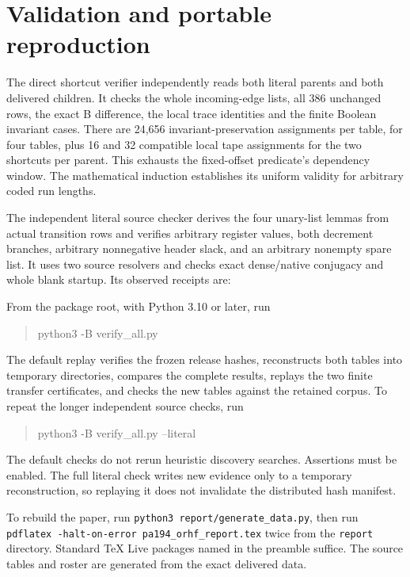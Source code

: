 \documentclass[11pt]{article}
\begin{document}
\section{Validation and portable reproduction}
The direct shortcut verifier independently reads both literal parents and both delivered children. It checks the whole incoming-edge lists, all 386 unchanged rows, the exact B difference, the local trace identities and the finite Boolean invariant cases. There are 24,656 invariant-preservation assignments per table, for four tables, plus 16 and 32 compatible local tape assignments for the two shortcuts per parent. This exhausts the fixed-offset predicate's dependency window. The mathematical induction establishes its uniform validity for arbitrary coded run lengths.

The independent literal source checker derives the four unary-list lemmas from actual transition rows and verifies arbitrary register values, both decrement branches, arbitrary nonnegative header slack, and an arbitrary nonempty spare list. It uses two source resolvers and checks exact dense/native conjugacy and whole blank startup. Its observed receipts are:
\begin{center}\end{center}

From the package root, with Python 3.10 or later, run
\begin{quote}\ttfamily
python3 -B verify\_all.py
\end{quote}
The default replay verifies the frozen release hashes, reconstructs both tables into temporary directories, compares the complete results, replays the two finite transfer certificates, and checks the new tables against the retained corpus. To repeat the longer independent source checks, run
\begin{quote}\ttfamily
python3 -B verify\_all.py --literal
\end{quote}
The default checks do not rerun heuristic discovery searches. Assertions must be enabled. The full literal check writes new evidence only to a temporary reconstruction, so replaying it does not invalidate the distributed hash manifest.

To rebuild the paper, run \texttt{python3 report/generate\_data.py}, then run \texttt{pdflatex -halt-on-error pa194\_orhf\_report.tex} twice from the \texttt{report} directory. Standard TeX Live packages named in the preamble suffice. The source tables and roster are generated from the exact delivered data.
\end{document}
